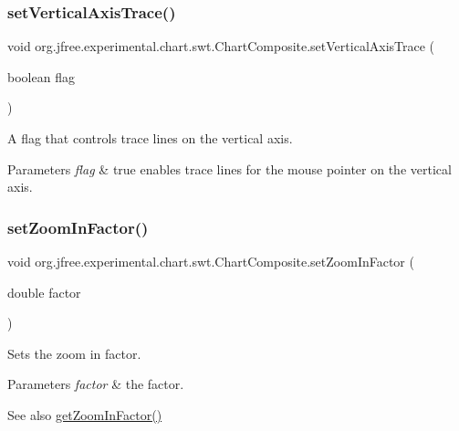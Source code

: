 \subsubsection{\texorpdfstring{set\+Vertical\+Axis\+Trace()}{setVerticalAxisTrace()}}
{\footnotesize\ttfamily void org.\+jfree.\+experimental.\+chart.\+swt.\+Chart\+Composite.\+set\+Vertical\+Axis\+Trace (\begin{DoxyParamCaption}\item[{boolean}]{flag }\end{DoxyParamCaption})}

A flag that controls trace lines on the vertical axis.


\begin{DoxyParams}{Parameters}
{\em flag} & {\ttfamily true} enables trace lines for the mouse pointer on the vertical axis. \\
\hline
\end{DoxyParams}
\mbox{\label{classorg_1_1jfree_1_1experimental_1_1chart_1_1swt_1_1_chart_composite_a6d67355c31636983a53bb8df72042def}} 
\subsubsection{\texorpdfstring{set\+Zoom\+In\+Factor()}{setZoomInFactor()}}
{\footnotesize\ttfamily void org.\+jfree.\+experimental.\+chart.\+swt.\+Chart\+Composite.\+set\+Zoom\+In\+Factor (\begin{DoxyParamCaption}\item[{double}]{factor }\end{DoxyParamCaption})}

Sets the zoom in factor.


\begin{DoxyParams}{Parameters}
{\em factor} & the factor.\\
\hline
\end{DoxyParams}
\begin{DoxySeeAlso}{See also}
\mbox{\hyperlink{classorg_1_1jfree_1_1experimental_1_1chart_1_1swt_1_1_chart_composite_a3cbdc5dd4939115b7ab7460273a5b43e}{get\+Zoom\+In\+Factor()}} 
\end{DoxySeeAlso}
\mbox{\label{classorg_1_1jfree_1_1experimental_1_1chart_1_1swt_1_1_chart_composite_a084745d3f14bf7149be79109f326aec7}} 
